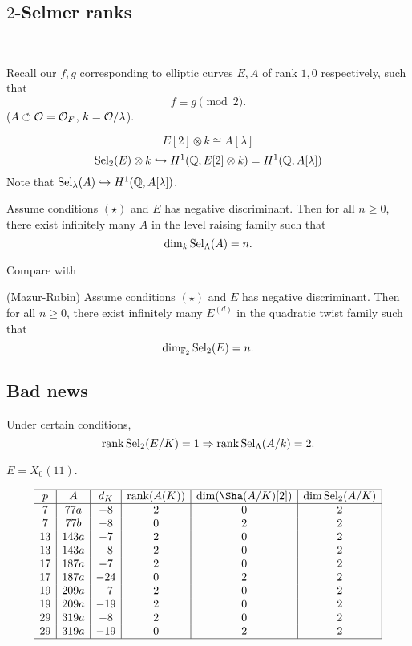 \documentclass[12pt,amsfont]{amsart}
\begin{document}
\subsection{$2$-Selmer ranks}
{\ }

Recall our $f,g$ corresponding to elliptic curves $E,A$ of rank $1, 0$ respectively, such that
\[f \equiv g \pmod{2}.\]
($A \circlearrowleft \mathcal{O} = \mathcal{O}_F$, $k = \mathcal{O}/\lambda$). 

\[E[2] \otimes k \cong A[\lambda]\]
\[\operatorname{Sel}_2(E) \otimes k \hookrightarrow H^1({\mathbb Q}, E[2] \otimes k) = H^1({\mathbb Q}, A[\lambda]) \]
Note that $\operatorname{Sel}_\lambda(A) \hookrightarrow H^1({\mathbb Q}, A[\lambda])$. 

\begin{thm} Assume conditions $(\star)$ and $E$ has negative discriminant. Then for all $n \geq 0$, there exist infinitely many $A$ in the level raising family such that
\[\dim_k \operatorname{Sel}_\Lambda(A) = n. \]
\end{thm}

Compare with

\begin{thm} (Mazur-Rubin) Assume conditions $(\star)$ and $E$ has negative discriminant. Then for all $n \geq 0$, there exist infinitely many $E^{(d)}$ in the quadratic twist family such that
\[\dim_{{\mathbb F}_2} \operatorname{Sel}_2(E) = n. \]
\end{thm}

\subsection{Bad news}

\begin{thm} Under certain conditions, 
\[\operatorname{rank} \operatorname{Sel}_2(E/K) = 1 \Rightarrow \operatorname{rank} \operatorname{Sel}_\Lambda(A/k) = 2. \]
\end{thm}

$E = X_0(11)$.

\[ \begin{array}{|c|c|c|c|c|c|} 
\hline
p & A & d_K & \rank(A(K)) & \dim(\Sha(A/K)[2]) & \dim \Sel_2(A/K)   \\
\hline
7 & 77a & -8 & 2 & 0 & 2\\
7 & 77b & -8 & 0 & 2 & 2\\
13 & 143a & -7 & 2 & 0 & 2\\
13 & 143a & -8 & 2 & 0 & 2\\
17 & 187a & -7 & 2 & 0 & 2\\
17 & 187a & -24 & 0 & 2 & 2\\
19 & 209a & -7 & 2 & 0 & 2\\
19 & 209a & -19 & 2 & 0 & 2\\ 
29 & 319a & -8 & 2 & 0 & 2\\
29 & 319a & -19 & 0 & 2 & 2\\
\hline

\end{array}
\]
\renewcommand{\thesubsection}{\arabic{section}.R}
\begingroup
\renewcommand{\addcontentsline}[3]{}%
\endgroup
\end{document}
